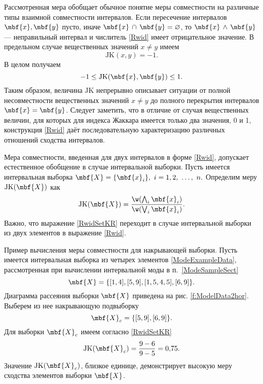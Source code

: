 \documentclass[a5paper,openany]{book}
\begin{document}
Рассмотренная мера обобщает обычное понятие меры совместности на различные типы взаимной совместности интервалов. 
Если пересечение интервалов $\mbf{x}, \mbf{y} $ пусто, иначе $\mbf{x} \, \cap \, \mbf{y} = \varnothing$, то $\mbf{x} \, \wedge \, \mbf{y}$ --- неправильный интервал и числитель \eqref{Rwid} имеет отрицательное значение. 
В предельном случае вещественных значений $x \neq y$ имеем
\begin{equation*}
	\mathrm{JK}(x, y) =-1.
\end{equation*}
В целом получаем
\begin{equation}\label{Rwidrange}
	-1 \leq \mathrm{JK}(\mbf{x}, \mbf{y}) \leq 1.
\end{equation}
Таким образом, величина $\mathrm{JK}$  непрерывно описывает ситуации от полной несовместности вещественных значений $x \neq y$ до полного перекрытия интервалов $\mbf{x} = \mbf{y}$.
Следует заметить, что в отличие от случая вещественных величин, для которых для  индекса Жаккара имеется только два значения, 0 и 1, конструкция \eqref{Rwid} даёт последовательную характеризацию различных отношений сходства интервалов.

Мера совместности, введенная  для двух интервалов  в форме \eqref{Rwid}, допускает естественное обобщение в случае интервальной выборки. 
Пусть имеется интервальная выборка  $\mbf{X} = \{ \mbf{x}_i \}, \ i=1,2, \ \ldots, \ n.$
Определим меру $\mathrm{JK}(\mbf{X}) $ как 
\begin{align} 
	\mathrm{JK}(\mbf{X}) = 
	\frac{\w (\bigwedge_i \mbf{x}_i )}{\w (\bigvee_i \mbf{x}_i)}. \label{RwidSetKR}
\end{align}
Важно, что выражение \eqref{RwidSetKR} переходит в случае интервальной выборки из двух элементов в выражение \eqref{Rwid}. %

\begin{example}{Пример вычисления меры совместности для накрывающей выборки.}
	Пусть имеется интервальная выборка из четырех элементов \eqref{ModeExampleData}, рассмотренная при вычислении интервальной моды в п.~\ref{ModeSampleSect}
	\begin{equation*}
		\mbf{X}   = \{ 
		[1, 4],  [5, 9],  [1,5, 4,5],   [6, 9]   \}.
	\end{equation*}	
	Диаграмма рассеяния выборки $\mbf{X}$ приведена на рис. \ref{f:ModelData2hor}.
	Выберем из нее накрывающую подвыборку
	\begin{equation*}
		\mbf{X}_{c}   = \{  
		[5, 9],   [6, 9]  \}.
	\end{equation*}	
	Для выборки $\mbf{X}_{c}$  имеем согласно \eqref{RwidSetKR}
	\begin{equation*}
		\mathrm{JK}(\mbf{X}_{c}) = \frac{9-6}{9-5} = 0,\!75.
	\end{equation*}
	Значение $\mathrm{JK}(\mbf{X}_{c})$, близкое единице, демонстрирует высокую меру сходства элементов выборки $\mbf{X}$.	
\end{example}
\end{document}
